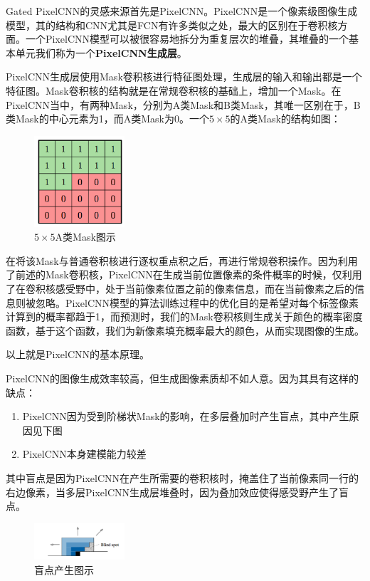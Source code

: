 Gated PixelCNN的灵感来源首先是PixelCNN。PixelCNN是一个像素级图像生成模型，其的结构和CNN尤其是FCN有许多类似之处，最大的区别在于卷积核方面。一个PixelCNN模型可以被很容易地拆分为重复层次的堆叠，其堆叠的一个基本单元我们称为一个\textbf{PixelCNN生成层}。

PixelCNN生成层使用Mask卷积核进行特征图处理，生成层的输入和输出都是一个特征图。Mask卷积核的结构就是在常规卷积核的基础上，增加一个Mask。在PixelCNN当中，有两种Mask，分别为A类Mask和B类Mask，其唯一区别在于，B类Mask的中心元素为1，而A类Mask为0。一个$5\times 5$的A类Mask的结构如图：

\begin{figure}[htp]
    \centering
    \includegraphics[width=0.3\textwidth]{figures/Mask结构.png}
    \caption{$5\times 5$A类Mask图示}
\end{figure}

在将该Mask与普通卷积核进行逐权重点积之后，再进行常规卷积操作。因为利用了前述的Mask卷积核，PixelCNN在生成当前位置像素的条件概率的时候，仅利用了在卷积核感受野中，处于当前像素位置之前的像素信息，而在当前像素之后的信息则被忽略。PixelCNN模型的算法训练过程中的优化目的是希望对每个标签像素计算到的概率都趋于1，而预测时，我们的Mask卷积核则生成关于颜色的概率密度函数，基于这个函数，我们为新像素填充概率最大的颜色，从而实现图像的生成。

以上就是PixelCNN的基本原理。

PixelCNN的图像生成效率较高，但生成图像素质却不如人意。因为其具有这样的缺点：

\begin{enumerate}
    \item PixelCNN因为受到阶梯状Mask的影响，在多层叠加时产生盲点，其中产生原因见下图
    \item PixelCNN本身建模能力较差
\end{enumerate}

其中盲点是因为PixelCNN在产生所需要的卷积核时，掩盖住了当前像素同一行的右边像素，当多层PixelCNN生成层堆叠时，因为叠加效应使得感受野产生了盲点。

\begin{figure}[htp]
    \centering
    \includegraphics[width=0.3\textwidth]{figures/盲点产生.png}
    \caption{盲点产生图示}
\end{figure}

